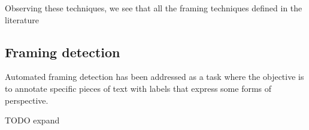 Observing these techniques, we see that all the framing techniques defined in the literature

\subsection{Framing detection}
\label{ssec:lit_framing_auto}

Automated framing detection has been addressed as a task where the objective is to annotate specific pieces of text with labels that express some forms of perspective.

TODO expand


